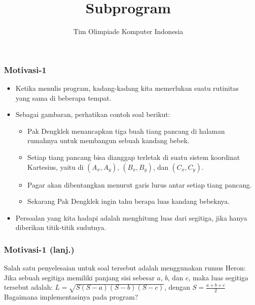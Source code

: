 

\title{Subprogram}
\author{Tim Olimpiade Komputer Indonesia}
\date{}



\begin{frame}
\titlepage
\end{frame}

\begin{frame}
\frametitle{Motivasi-1}
\begin{itemize}
  \item Ketika menulis program, kadang-kadang kita memerlukan suatu rutinitas yang sama di beberapa tempat.
  \item Sebagai gambaran, perhatikan contoh soal berikut:
  \begin{itemize}
    \item Pak Dengklek menancapkan tiga buah tiang pancang di halaman rumahnya untuk membangun sebuah kandang bebek.
    \item Setiap tiang pancang bisa dianggap terletak di suatu sistem koordinat Kartesius, yaitu di $(A_x, A_y)$, $(B_x, B_y)$, dan $(C_x, C_y)$.
    \item Pagar akan dibentangkan menurut garis lurus antar setiap tiang pancang.
    \item Sekarang Pak Dengklek ingin tahu berapa luas kandang bebeknya.
  \end{itemize}
  \item Persoalan yang kita hadapi adalah menghitung luas dari segitiga, jika hanya diberikan titik-titik sudutnya.
\end{itemize}
\end{frame}

\begin{frame}
\frametitle{Motivasi-1 (lanj.)}
Salah satu penyelesaian untuk soal tersebut adalah menggunakan rumus Heron:
\newline \newline
Jika sebuah segitiga memiliki panjang sisi sebesar $a$, $b$, dan $c$, maka luas segitiga tersebut adalah:
\newline
$L = \sqrt{S(S-a)(S-b)(S-c)}$, dengan $S = \frac{a+b+c}{2}$
\vfill
Bagaimana implementasinya pada program?
\end{frame}

